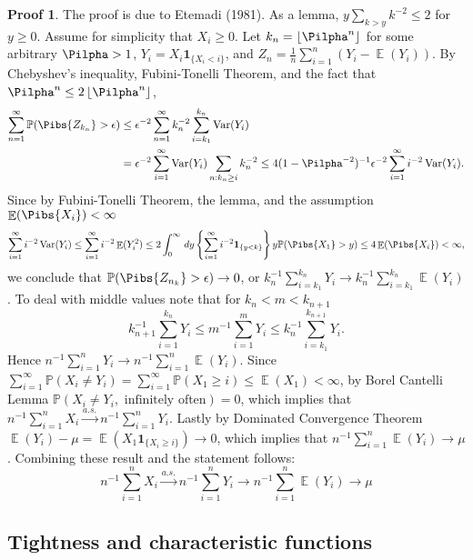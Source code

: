 \documentclass[hidelinks,11pt]{article}
\theoremstyle{definition}
\theoremstyle{dotless}
\newtheorem{prop}{Proof}[section]
\theoremstyle{remark}
\DeclareMathOperator{\Var}{Var}
\DeclareMathOperator{\E}{\mathbb{E}}
\DeclareMathOperator{\1}{\mathbf{1}}
\begin{document}
\begin{prop}
The proof is due to Etemadi (1981). As a lemma, $y\sum_{k>y}k^{-2}\leq2$ for $y\geq0$.\medbreak
Assume for simplicity that $X_i\geq0$. Let $k_n=\left\lfloor{\Pilpha^n}\right\rfloor$ for some arbitrary $\Pilpha>1$, $Y_i=X_i\textbf{1}_{\{X_i<i\}}$, and $Z_n=\frac{1}{n}\sum_{i=1}^n(Y_i-\E(Y_i))$.\medbreak
By Chebyshev's inequality,  Fubini-Tonelli Theorem, and the fact that $\Pilpha^n\leq2\left\lfloor{\Pilpha^n}\right\rfloor$,
\begin{align*}
\sum_{n=1}^\infty\mathbb{P}(\Pibs{Z_{k_n}}>\epsilon)&\leq\epsilon^{-2}\sum_{n=1}^\infty k_n^{-2}\sum_{i=k_1}^{k_n}\Var(Y_i)\\
&=\epsilon^{-2}\sum_{i=1}^\infty\Var(Y_i)\sum_{n:k_n\geq i}k_n^{-2}\leq4(1-\Pilpha^{-2})^{-1}\epsilon^{-2}\sum_{i=1}^\infty i^{-2}\Var(Y_i).
\end{align*}
Since by Fubini-Tonelli Theorem, the lemma, and the assumption $\E(\Pibs{X_i})<\infty$
\[\sum_{i=1}^\infty i^{-2}\Var(Y_i)\leq\sum_{i=1}^\infty i^{-2}\E(Y_i^2)\leq2\int_0^\infty\,dy\left\{\sum_{i=1}^\infty i^{-2}\textbf{1}_{\{y<k\}}\right\}y\mathbb{P}(\Pibs{X_1}>y)\leq4\E(\Pibs{X_i})<\infty,\]
we conclude that $\mathbb{P}(\Pibs{Z_{n_k}}>\epsilon)\to0$, or $k_n^{-1}\sum_{i=k_1}^{k_n}Y_i\to k_n^{-1}\sum_{i=k_1}^{k_n}\E(Y_i)$. To deal with middle values note that for $k_n<m<k_{n+1}$
\[k_{n+1}^{-1}\sum_{i=1}^{k_n}Y_i\leq m^{-1}\sum_{i=1}^mY_i\leq k_n^{-1}\sum_{i=k_1}^{k_{n+1}}Y_i.\]
Hence $n^{-1}\sum_{i=1}^nY_i\to n^{-1}\sum_{i=1}^n\E(Y_i)$.\medbreak
Since $\sum_{i=1}^\infty\mathbb{P}(X_i\neq Y_i)=\sum_{i=1}^\infty\mathbb{P}(X_1\geq i)\leq\E(X_1)<\infty$, by Borel Cantelli Lemma $\mathbb{P}(X_i\neq Y_i,\textrm{ infinitely often})=0$, which implies that $n^{-1}\sum_{i=1}^nX_i\xrightarrow{a.s.}n^{-1}\sum_{i=1}^nY_i$.\medbreak
Lastly by Dominated Convergence Theorem $\E(Y_i)-\mu=\E(X_1\textbf{1}_{\{X_i\geq i\}})\to0$, which implies that $n^{-1}\sum_{i=1}^n\E(Y_i)\to\mu$. Combining these result and the statement follows:
\[n^{-1}\sum_{i=1}^nX_i\xrightarrow{a.s.}n^{-1}\sum_{i=1}^nY_i\to n^{-1}\sum_{i=1}^n\E(Y_i)\to\mu\]
\end{prop}

\subsection{Tightness and characteristic functions}
\end{document}
